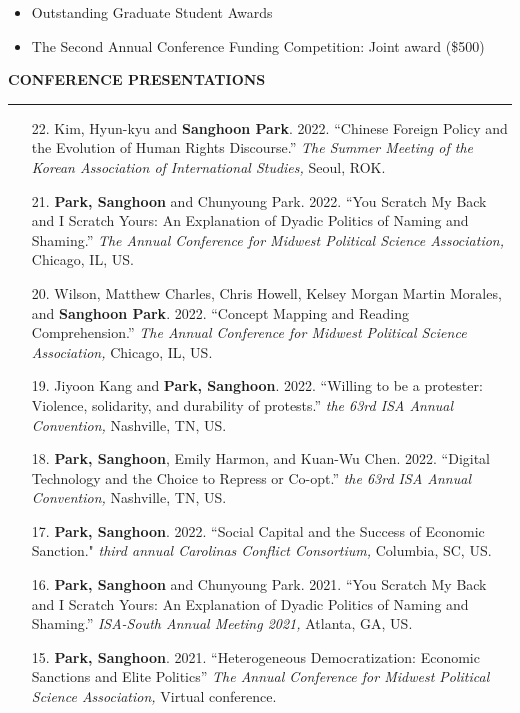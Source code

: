 \documentclass[
  16,
]{article}
\providecommand{\tightlist}{%
  \setlength{\itemsep}{0pt}\setlength{\parskip}{0pt}}\usepackage{longtable,booktabs,array}
\begin{document}
\begin{itemize}
\tightlist
\item
  Outstanding Graduate Student Awards
\item
  The Second Annual Conference Funding Competition: Joint award (\$500)
\end{itemize}

\vspace{7pt}

\begin{large}{\bf CONFERENCE PRESENTATIONS}
  \vspace{3pt}
  \hrule
\end{large}

\begin{itemize}
  \item[22.] Kim, Hyun-kyu and {\bf Sanghoon Park}. {2022.} {``Chinese Foreign Policy and the Evolution of Human Rights Discourse.''} {\it The Summer Meeting of the Korean Association of International Studies,} Seoul, ROK.
  \item[21.] {\bf Park, Sanghoon} and Chunyoung Park. {2022.} {``You Scratch My Back and I Scratch Yours: An Explanation of Dyadic Politics of Naming and Shaming.''} {\it The Annual Conference for Midwest Political Science Association,} Chicago, IL, US.
  \item[20.] Wilson, Matthew Charles, Chris Howell, Kelsey Morgan Martin Morales, and {\bf Sanghoon Park}. {2022.} {``Concept Mapping and Reading Comprehension.''} {\it The Annual Conference for Midwest Political Science Association,} Chicago, IL, US.
  \item[19.] Jiyoon Kang and {\bf Park, Sanghoon}. {2022.} {``Willing to be a protester: Violence, solidarity, and durability of protests.''} {\it the 63rd ISA Annual Convention,} Nashville, TN, US.
  \item[18.] {\bf Park, Sanghoon}, Emily Harmon, and Kuan-Wu Chen. {2022.} {``Digital Technology and the Choice to Repress or Co-opt.''} {\it the 63rd ISA Annual Convention,} Nashville, TN, US.
  \item[17.] {\bf Park, Sanghoon}. {2022.} {``Social Capital and the Success of Economic Sanction."} {\it third annual Carolinas Conflict Consortium,} Columbia, SC, US.
  \item[16.] {\bf Park, Sanghoon} and Chunyoung Park. {2021.} {``You Scratch My Back and I Scratch Yours: An Explanation of Dyadic Politics of Naming and Shaming.''} {\it ISA-South Annual Meeting 2021,} Atlanta, GA, US.
  \item[15.] {\bf Park, Sanghoon}. {2021.} {``Heterogeneous Democratization: Economic Sanctions and Elite Politics''} {\it The Annual Conference for Midwest Political Science Association,} Virtual conference.

\end{itemize}
\end{document}
